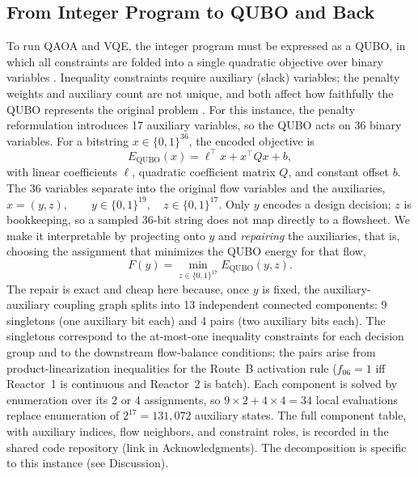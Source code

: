\documentclass[10pt,letterpaper]{article}
\begin{document}
\subsection{From Integer Program to QUBO and Back}
\label{subsec:ds-mfg-qubo-repair}

To run QAOA and VQE, the integer program must be expressed as a QUBO, in which all constraints are folded into a single quadratic objective over binary variables \cite{glover2019, toqubo:2023}.
Inequality constraints require auxiliary (slack) variables; the penalty weights and auxiliary count are not unique, and both affect how faithfully the QUBO represents the original problem \cite{toqubo:2023}.
For this instance, the penalty reformulation introduces 17 auxiliary variables, so the QUBO acts on 36 binary variables.
For a bitstring $x \in \{0,1\}^{36}$, the encoded objective is
\begin{equation}
    E_{\mathrm{QUBO}}(x)
    =
    \ell^\top x + x^\top Qx + b,
    \label{eq:ds-mfg-full-qubo}
\end{equation}
with linear coefficients $\ell$, quadratic coefficient matrix $Q$, and constant offset $b$.
The 36 variables separate into the original flow variables and the auxiliaries,
\(
    x = (y,z), \qquad
    y \in \{0,1\}^{19}, \quad z \in \{0,1\}^{17}.
\)
Only $y$ encodes a design decision; $z$ is bookkeeping, so a sampled 36-bit string does not map directly to a flowsheet.
We make it interpretable by projecting onto $y$ and \emph{repairing} the auxiliaries, that is, choosing the assignment that minimizes the QUBO energy for that flow,
\begin{equation}
    F(y)
    =
    \min_{z \in \{0,1\}^{17}} E_{\mathrm{QUBO}}(y,z).
    \label{eq:ds-mfg-repaired-objective}
\end{equation}
The repair is exact and cheap here because, once $y$ is fixed, the auxiliary-auxiliary coupling graph splits into 13 independent connected components: 9 singletons (one auxiliary bit each) and 4 pairs (two auxiliary bits each).
The singletons correspond to the at-most-one inequality constraints for each decision group and to the downstream flow-balance conditions; the pairs arise from product-linearization inequalities for the Route~B activation rule ($f_{06}=1$ iff Reactor~1 is continuous and Reactor~2 is batch).
Each component is solved by enumeration over its 2 or 4 assignments, so $9\!\times\!2+4\!\times\!4=34$ local evaluations replace enumeration of $2^{17}=131{,}072$ auxiliary states.
The full component table, with auxiliary indices, flow neighbors, and constraint roles, is recorded in the shared code repository (link in Acknowledgments).
The decomposition is specific to this instance (see Discussion).
\end{document}
